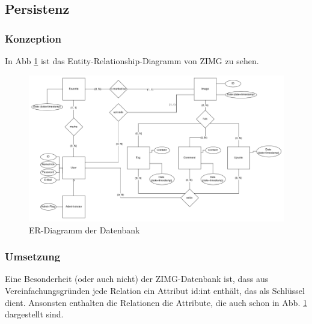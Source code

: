 \documentclass[12pt, oneside, a4paper]{article}		%
\begin{document}
\subsection{Persistenz}

\subsubsection{Konzeption}

In Abb \ref{ERDiagramDatabase} ist das Entity-Relationship-Diagramm von ZIMG zu sehen.

\begin{figure}[H]
	\centering
	\includegraphics[width=\linewidth]{footage/ZIMG_ERDiagram_Database} 
	\caption{ER-Diagramm der Datenbank}
	\label{ERDiagramDatabase}
\end{figure}

\subsubsection{Umsetzung}

Eine Besonderheit (oder auch nicht) der ZIMG-Datenbank ist, dass aus Vereinfachungsgründen jede Relation ein Attribut id:int enthält, das als Schlüssel dient. Ansonsten enthalten die Relationen die Attribute, die auch schon in Abb. \ref{ERDiagramDatabase} dargestellt sind.
\end{document}
